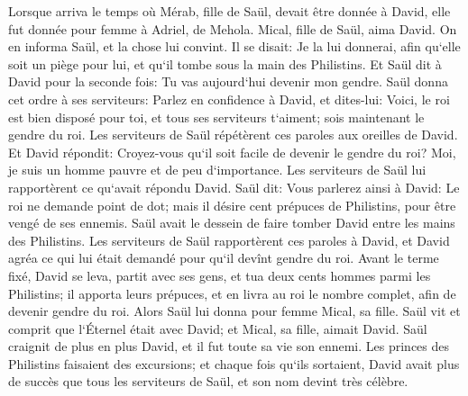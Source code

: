 \verse Lorsque arriva le temps où Mérab, fille de Saül, devait être donnée à David, elle fut donnée pour femme à Adriel, de Mehola. 
\verse Mical, fille de Saül, aima David. On en informa Saül, et la chose lui convint. 
\verse Il se disait: Je la lui donnerai, afin qu`elle soit un piège pour lui, et qu`il tombe sous la main des Philistins. Et Saül dit à David pour la seconde fois: Tu vas aujourd`hui devenir mon gendre. 
\verse Saül donna cet ordre à ses serviteurs: Parlez en confidence à David, et dites-lui: Voici, le roi est bien disposé pour toi, et tous ses serviteurs t`aiment; sois maintenant le gendre du roi. 
\verse Les serviteurs de Saül répétèrent ces paroles aux oreilles de David. Et David répondit: Croyez-vous qu`il soit facile de devenir le gendre du roi? Moi, je suis un homme pauvre et de peu d`importance. 
\verse Les serviteurs de Saül lui rapportèrent ce qu`avait répondu David. 
\verse Saül dit: Vous parlerez ainsi à David: Le roi ne demande point de dot; mais il désire cent prépuces de Philistins, pour être vengé de ses ennemis. Saül avait le dessein de faire tomber David entre les mains des Philistins. 
\verse Les serviteurs de Saül rapportèrent ces paroles à David, et David agréa ce qui lui était demandé pour qu`il devînt gendre du roi. 
\verse Avant le terme fixé, David se leva, partit avec ses gens, et tua deux cents hommes parmi les Philistins; il apporta leurs prépuces, et en livra au roi le nombre complet, afin de devenir gendre du roi. Alors Saül lui donna pour femme Mical, sa fille. 
\verse Saül vit et comprit que l`Éternel était avec David; et Mical, sa fille, aimait David. 
\verse Saül craignit de plus en plus David, et il fut toute sa vie son ennemi. 
\verse Les princes des Philistins faisaient des excursions; et chaque fois qu`ils sortaient, David avait plus de succès que tous les serviteurs de Saül, et son nom devint très célèbre. 

